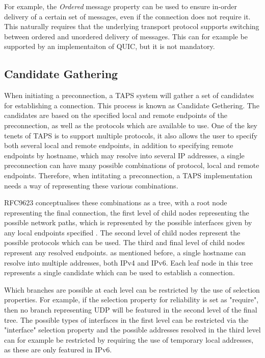 For example, the \textit{Ordered}
message property can be used to ensure in-order delivery
of a certain set of messages, even if the connection
does not require it. This naturally requires that the underlying
transport protocol supports switching between ordered and
unordered delivery of messages. This can for example be
supported by an implementaiton of QUIC, but it is not mandatory.

\subsection{Candidate Gathering}
When initiating a preconnection, a TAPS system will gather a
set of candidates for establishing a connection. This process
is known as Candidate Gethering. The candidates are based on
the specified local and remote endpoints of the preconnection,
as well as the protocols which are available to use. 
One of the key tenets of TAPS is to support multiple protocols,
it also allows the user to specify both several local and remote endpoints,
in addition to specifying remote endpoints by hostname, which
may resolve into several IP addresses, a single preconnection
can have many possible combinations of protocol, local and 
remote endpoints. Therefore, when intitating a preconnection,
a TAPS implementation needs a way of representing these various
combinations.

RFC9623 conceptualises these combinations as a tree,
with a root node representing the final connection, the
first level of child nodes representing the possible network paths,
which is represented by the possible interfaces given by
any local endpoints specified \cite{brunstromImplementingInterfacesTransport2025}.
The second level of child nodes represent the possible protocols
which can be used.
The third and final level of child nodes represent any resolved
endpoints. as mentioned before, a single hostname can resolve 
into multiple addresses, both IPv4 and IPv6.
Each leaf node in this tree represents a single candidate
which can be used to establish a connection.

Which branches are possible at each level can be restricted
by the use of selection properties. For example, if the
selection property for reliability is set as "require",
then no branch representing UDP will be featured in the
second level of the final tree. The possible types of interfaces
in the first level can be restricted via the "interface" selection
property and the possible addresses resolved in the third level can
for example be restricted by requiring the use of temporary local
addresses, as these are only featured in IPv6.

